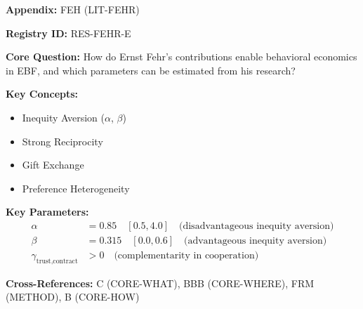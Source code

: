 \begin{tcolorbox}[colback=blue!5!white, colframe=blue!75!black,
    title=Quick Reference: Appendix FEH]

\textbf{Appendix:} FEH (LIT-FEHR)

\textbf{Registry ID:} RES-FEHR-E

\textbf{Core Question:} How do Ernst Fehr's contributions enable behavioral economics
in EBF, and which parameters can be estimated from his research?

\textbf{Key Concepts:}
\begin{itemize}[nosep]
\item Inequity Aversion ($\alpha$, $\beta$)
\item Strong Reciprocity
\item Gift Exchange
\item Preference Heterogeneity
\end{itemize}

\textbf{Key Parameters:}
\begin{align}
\alpha &= 0.85 \quad [0.5, 4.0] \quad \text{(disadvantageous inequity aversion)} \\
\beta &= 0.315 \quad [0.0, 0.6] \quad \text{(advantageous inequity aversion)} \\
\gamma_{\text{trust,contract}} &> 0 \quad \text{(complementarity in cooperation)}
\end{align}

\textbf{Cross-References:} C (CORE-WHAT), BBB (CORE-WHERE), FRM (METHOD), B (CORE-HOW)
\end{tcolorbox}


\begin{abstract}
This appendix documents the comprehensive research contributions of Ernst Fehr
(h-index: 157, 180,000+ citations) to behavioral economics and their integration
into the Evidence-Based Framework (EBF). Fehr's work provides the empirical
foundation for EBF's treatment of social preferences, establishing that utility
includes other-regarding components ($U^S$) with measurable parameters. The appendix
catalogs 144 integrated papers, documents non-integrated papers with evaluation,
and provides practitioners with actionable parameter estimates and case examples.
\end{abstract}


